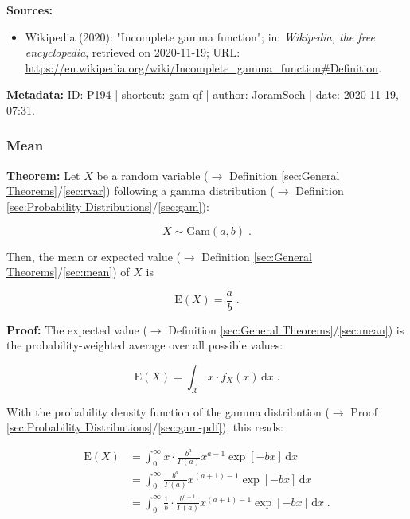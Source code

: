 \documentclass[a4paper,12pt,twoside]{book}
\begin{document}
\vspace{1em}
\textbf{Sources:}
\begin{itemize}
\item Wikipedia (2020): "Incomplete gamma function"; in: \textit{Wikipedia, the free encyclopedia}, retrieved on 2020-11-19; URL: \url{https://en.wikipedia.org/wiki/Incomplete_gamma_function#Definition}.
\end{itemize}


\vspace{1em}
\textbf{Metadata:} ID: P194 | shortcut: gam-qf | author: JoramSoch | date: 2020-11-19, 07:31.
\vspace{1em}



\subsubsection[\textbf{Mean}]{Mean} \label{sec:gam-mean}
\setcounter{equation}{0}

\textbf{Theorem:} Let $X$ be a random variable ($\rightarrow$ Definition \ref{sec:General Theorems}/\ref{sec:rvar}) following a gamma distribution ($\rightarrow$ Definition \ref{sec:Probability Distributions}/\ref{sec:gam}):

\begin{equation} \label{eq:gam-mean-gam}
X \sim \mathrm{Gam}(a, b) \; .
\end{equation}

Then, the mean or expected value ($\rightarrow$ Definition \ref{sec:General Theorems}/\ref{sec:mean}) of $X$ is

\begin{equation} \label{eq:gam-mean-gam-mean}
\mathrm{E}(X) = \frac{a}{b} \; .
\end{equation}


\vspace{1em}
\textbf{Proof:} The expected value ($\rightarrow$ Definition \ref{sec:General Theorems}/\ref{sec:mean}) is the probability-weighted average over all possible values:

\begin{equation} \label{eq:gam-mean-mean}
\mathrm{E}(X) = \int_{\mathcal{X}} x \cdot f_X(x) \, \mathrm{d}x \; .
\end{equation}

With the probability density function of the gamma distribution ($\rightarrow$ Proof \ref{sec:Probability Distributions}/\ref{sec:gam-pdf}), this reads:

\begin{equation} \label{eq:gam-mean-gam-mean-s1}
\begin{split}
\mathrm{E}(X) &= \int_{0}^{\infty} x \cdot \frac{b^a}{\Gamma(a)} x^{a-1} \exp[-b x] \, \mathrm{d}x \\
&= \int_{0}^{\infty} \frac{b^a}{\Gamma(a)} x^{(a+1)-1} \exp[-b x] \, \mathrm{d}x \\
&= \int_{0}^{\infty} \frac{1}{b} \cdot \frac{b^{a+1}}{\Gamma(a)} x^{(a+1)-1} \exp[-b x] \, \mathrm{d}x \; .
\end{split}
\end{equation}
\end{document}
